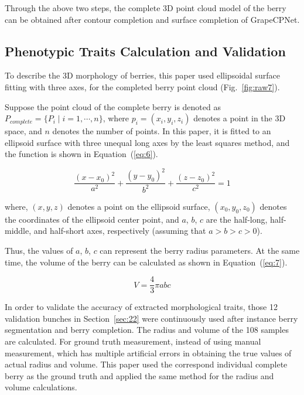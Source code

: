 \documentclass[12pt]{article}
\begin{document}
Through the above two steps, the complete 3D point cloud model of the berry can be obtained after contour completion and surface completion of GrapeCPNet.

\subsection{Phenotypic Traits Calculation and Validation}

To describe the 3D morphology of berries, this paper used ellipsoidal surface fitting with three axes, for the completed berry point cloud (Fig.~\ref{fig:raw7}).


Suppose the point cloud of the complete berry is denoted as $P_{complete}=\{P_i \mid i=1, \cdots,n\}$, where $p_i=(x_i,y_i,z_i)$ denotes a point in the 3D space, and $n$ denotes the number of points. 
In this paper, it is fitted to an ellipsoid surface with three unequal long axes by the least squares method, and the function is shown in Equation~(\ref{eq:6}).

\begin{equation}
    \frac{(x-x_0)^2}{a^2} + \frac{(y-y_0)^2}{b^2} + \frac{(z-z_0)^2}{c^2} = 1
    \label{eq:6}
\end{equation}

{\raggedright where, $(x,y,z)$ denotes a point on the ellipsoid surface, $(x_0,y_0,z_0)$ denotes the coordinates of the ellipsoid center point, and $a$, $b$, $c$ are the half-long, half-middle, and half-short axes, respectively (assuming that $a>b>c>0$). }

Thus, the values of $a$, $b$, $c$ can represent the berry radius parameters. 
At the same time, the volume of the berry can be calculated as shown in Equation~(\ref{eq:7}).

\begin{equation}
    V=\frac{4}{3} \pi a b c
    \label{eq:7}
\end{equation}

In order to validate the accuracy of extracted morphological traits, those 12 validation bunches in Section~\ref{sec:22} were continuously used after instance berry segmentation and berry completion. 
The radius and volume of the 108 samples are calculated. 
For ground truth measurement, instead of using manual measurement, which has multiple artificial errors in obtaining the true values of actual radius and volume. 
This paper used the correspond individual complete berry as the ground truth and applied the same method for the radius and volume calculations. 
\end{document}
